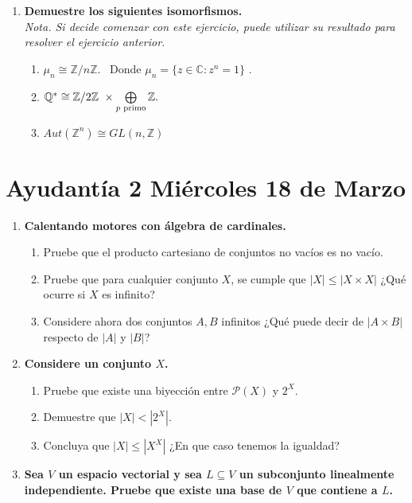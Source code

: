 \documentclass{article}
\theoremstyle{definition}
\theoremstyle{remark}
\numberwithin{equation}{section}
\begin{document}
\begin{enumerate}
\begin{enumerate}
\item $(\mathbb{Q},+)$
\item $(\mathbb{Q}^*,\cdot)$
\item $(\mu_n=\{ z \in \mathbb{C} : z^n=1\}, \cdot)$
\end{enumerate}

\item \textbf{Demuestre los siguientes isomorfismos.}\\
\textit{Nota. Si decide comenzar con este ejercicio, puede utilizar su resultado para resolver el ejercicio anterior.}
\begin{enumerate}
\item $\mu_n\cong \mathbb{Z}/n\mathbb{Z}$. \ Donde $\mu_n=\{ z \in \mathbb{C} : z^n=1\}$ .
\item $\mathbb{Q}^* \cong \mathbb{Z}/2\mathbb{Z} \ \times \bigoplus\limits_{p \textnormal{ primo}} \mathbb{Z}.$ 
\item $Aut(\mathbb{Z}^n) \cong GL(n,\mathbb{Z})$
\end{enumerate}


\end{enumerate}



\newpage
\section{Ayudantía 2 Miércoles 18 de Marzo}


\begin{enumerate}
\item \textbf{Calentando motores con álgebra de cardinales.}
\begin{enumerate}
\item Pruebe que el producto cartesiano de conjuntos no vacíos es no vacío.

\item Pruebe que para cualquier conjunto $X$, se cumple que $|X| \leq |X \times X|$  ¿Qué ocurre si $X$ es infinito?

\item Considere ahora dos conjuntos $A,B$ infinitos ¿Qué puede decir de $|A \times B|$ respecto de $|A|$ y $|B|$?

\end{enumerate}

\item \textbf{Considere un conjunto $X$.}
\begin{enumerate}
\item Pruebe que existe una biyección entre $\mathcal{P}(X)$ y $2^X$.
\item Demuestre que $|X| <  |2^X|.$
\item Concluya que $|X| \leq |X^X|$ ¿En que caso tenemos la igualdad?
\end{enumerate}

\item \textbf{Sea $V$ un espacio vectorial y sea $L \subseteq V$ un subconjunto linealmente independiente.
Pruebe que existe una base de $V$ que contiene a $L$.}
\end{enumerate}
\end{document}
